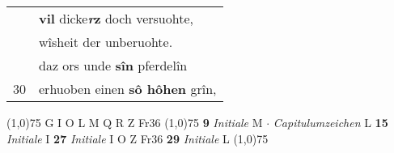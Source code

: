 \documentclass[8pt,a4paper,notitlepage]{article}
\begin{document}
\begin{table}[ht]
\begin{minipage}[t]{0.5\linewidth}
\begin{tabular}{rl}
 & \textbf{vil} dicke\textbf{\textit{r}z} doch versuohte,\\ 
 & wîsheit der unberuohte.\\ 
 & daz ors unde \textbf{sîn} pferdelîn\\ 
30 & erhuoben einen \textbf{sô hôhen} grîn,\\ 
\end{tabular}
\scriptsize
\line(1,0){75} \newline
G I O L M Q R Z Fr36 \newline
\line(1,0){75} \newline
\textbf{9} \textit{Initiale} M   $\cdot$ \textit{Capitulumzeichen} L  \textbf{15} \textit{Initiale} I  \textbf{27} \textit{Initiale} I O Z Fr36  \textbf{29} \textit{Initiale} L  \newline
\line(1,0){75} \newline

\end{minipage}
\end{table}
\end{document}
